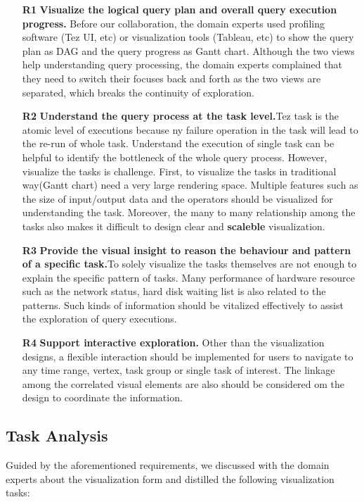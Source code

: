 \begin{itemize}
	\item[\textbf{R1}]\textbf{Visualize the logical query plan and overall query execution progress.} Before our collaboration, the domain experts used profiling software (Tez  UI, etc) or visualization tools (Tableau, etc) to show the query plan as DAG and the query progress as Gantt chart. Although the two views help understanding query processing, the domain experts complained that they need to switch their focuses back and forth as the two views are separated, which breaks the continuity of exploration.
	
	\item[\textbf{R2}]\textbf{Understand the query process at the task level.}Tez task is the atomic level of executions because ny failure operation in the task will lead to the re-run of whole task. Understand the execution of single task can be helpful to identify the bottleneck of the whole query process. However, visualize the tasks is challenge. First, to visualize the tasks in traditional way(Gantt chart) need a very large rendering space. Multiple features such as the size of input/output data and the operators should be visualized for understanding the task. Moreover, the many to many relationship among the tasks also makes it difficult to design clear and \textbf{scaleble} visualization.
	\item[\textbf{R3}]\textbf{Provide the visual insight to reason the behaviour and pattern of a specific task.}To solely visualize the tasks themselves are not enough to explain the specific pattern of tasks. Many performance of hardware resource such as the network status, hard disk waiting list is also related to the patterns. Such kinds of information should be vitalized effectively to assist the exploration of query executions. 
	\item[\textbf{R4}]\textbf{ Support interactive exploration.} Other than the visualization designs, a flexible interaction should be implemented for users to navigate to any time range, vertex, task group or single task of interest. The linkage among the correlated visual elements are also should be considered om the design to coordinate the information.
\end{itemize}

\subsection{Task Analysis}
Guided by the aforementioned requirements, we discussed with the domain experts about the visualization form and distilled the following visualization tasks:

